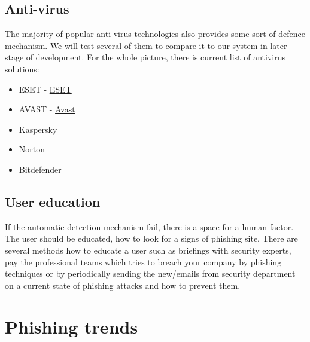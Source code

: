 \documentclass[
  digital, %
  oneside, %
  table,   %
  nolof,     %
  nolot,     %
]{fithesis3}
\begin{document}
\subsection{Anti-virus}



The majority of popular anti-virus technologies also provides some sort of defence mechanism. We will test several of them to compare it to our system in later stage of development. For the whole picture, there is current list of antivirus solutions:
\begin{itemize}
    \item ESET - \href{https://www.eset.com/us/anti-phishing/}{ESET}
    \item AVAST - \href{https://blog.avast.com/avast-improves-phishing-detection-avast}{Avast}
    \item Kaspersky
    \item Norton
    \item Bitdefender
\end{itemize}


\subsection{User education}

If the automatic detection mechanism fail, there is a space for a human factor. The user should be educated, how to look for a signs of phishing site. There are several methods how to educate a user such as briefings with security experts,
 pay the professional teams which tries to breach your company by phishing techniques  or by periodically sending the new/emails from security department on a current state of phishing attacks and how to prevent them.

\section{Phishing trends}
\end{document}
